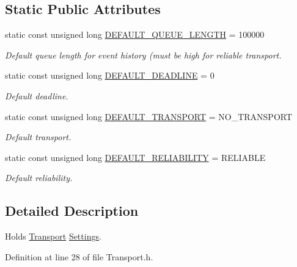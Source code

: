 \subsection*{Static Public Attributes}
\begin{DoxyCompactItemize}
\item 
static const unsigned long \hyperlink{classMadara_1_1Transport_1_1Settings_a27572b46bf3f74df9009f9e4adda6325}{DEFAULT\_\-QUEUE\_\-LENGTH} = 100000
\begin{DoxyCompactList}\small\item\em Default queue length for event history (must be high for reliable transport. \item\end{DoxyCompactList}\item 
static const unsigned long \hyperlink{classMadara_1_1Transport_1_1Settings_a20f9e030cad28fd6c92e134613f4c903}{DEFAULT\_\-DEADLINE} = 0
\begin{DoxyCompactList}\small\item\em Default deadline. \item\end{DoxyCompactList}\item 
static const unsigned long \hyperlink{classMadara_1_1Transport_1_1Settings_a48f5fdda61c339261aba80be0dc0407b}{DEFAULT\_\-TRANSPORT} = NO\_\-TRANSPORT
\begin{DoxyCompactList}\small\item\em Default transport. \item\end{DoxyCompactList}\item 
static const unsigned long \hyperlink{classMadara_1_1Transport_1_1Settings_a291cf13dbc19a475e95172d9adf7e97c}{DEFAULT\_\-RELIABILITY} = RELIABLE
\begin{DoxyCompactList}\small\item\em Default reliability. \item\end{DoxyCompactList}\end{DoxyCompactItemize}


\subsection{Detailed Description}
Holds \hyperlink{namespaceMadara_1_1Transport}{Transport} \hyperlink{classMadara_1_1Transport_1_1Settings}{Settings}. 

Definition at line 28 of file Transport.h.



